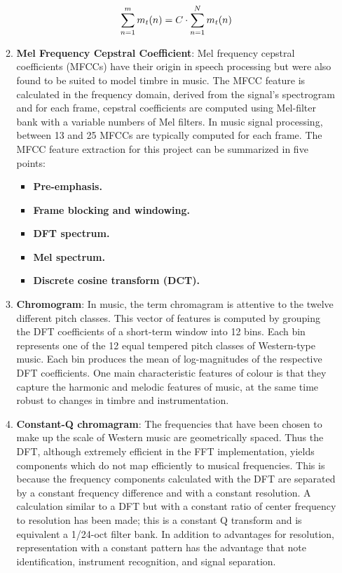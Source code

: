 \documentclass[conference]{IEEEtran}
\begin{document}
\begin{enumerate}
\begin{enumerate}
        \begin{equation}\label{eq:spectral_rolloff}\small
            \sum_{n=1}^{m} m_t(n) = C\cdot \sum_{n=1}^{N} m_t(n)
        \end{equation}
        \item\textbf{Mel Frequency Cepstral Coefficient}: Mel frequency cepstral coefficients (MFCCs) have their origin in speech processing but were also found to be suited to model timbre in music. The MFCC feature is calculated in the frequency domain, derived from the signal’s spectrogram and for each frame, cepstral coefficients are computed using Mel-filter bank with a variable numbers of Mel filters. In music signal processing, between 13 and 25 MFCCs are typically computed for each frame. The MFCC feature extraction for this project can be summarized in five points\cite{mfccs}:
        \begin{itemize}
          \item\textbf{Pre-emphasis.}
          \item\textbf{Frame blocking and windowing.}
          \item\textbf{DFT spectrum.}
          \item\textbf{Mel spectrum.}
          \item\textbf{Discrete cosine transform (DCT).}
        \end{itemize}
        \item\textbf{Chromogram}: In music, the term chromagram is attentive to the twelve different pitch classes. This vector of features is computed by grouping the DFT coefficients of a short-term window into 12 bins. Each bin represents one of the 12 equal tempered pitch classes of Western-type music. Each bin produces the mean of log-magnitudes of the respective DFT coefficients. One main characteristic features of colour is that they capture the harmonic and melodic features of music, at the same time robust to changes in timbre and instrumentation.
        \item\textbf{Constant-Q chromagram}: The frequencies that have been chosen to make up the scale of Western music are geometrically spaced. Thus the DFT, although extremely efficient in the FFT implementation, yields components which do not map efficiently to musical frequencies. This is because the frequency components calculated with the DFT are separated by a constant frequency difference and with a constant resolution. A calculation similar to a DFT but with a constant ratio of center frequency to resolution has been made; this is a constant Q transform and is equivalent a 1/24-oct filter bank. In addition to advantages for resolution, representation with a constant pattern has the advantage that note identification, instrument recognition, and signal separation.\cite{costant_q}

\end{enumerate}
\end{enumerate}
\end{document}
